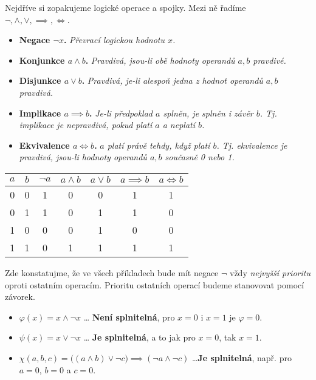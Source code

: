 Nejdříve si zopakujeme logické operace a spojky. Mezi ně řadíme $\neg, \land, \lor, \implies, \iff$.
\begin{itemize}
    \item \textbf{Negace $\neg x$.} \emph{Převrací logickou hodnotu $x$.}
    \item \textbf{Konjunkce $a\land b$.} \emph{Pravdivá, jsou-li obě hodnoty operandů $a,b$ pravdivé.}
    \item \textbf{Disjunkce $a\lor b$.} \emph{Pravdivá, je-li alespoň jedna z hodnot operandů $a,b$ pravdivá.}
    \item \textbf{Implikace $a\implies b$.} \emph{Je-li předpoklad $a$ splněn, je splněn i závěr $b$. Tj. implikace je nepravdivá, pokud platí $a$ a neplatí $b$.}
    \item \textbf{Ekvivalence $a\iff b$.} \emph{$a$ platí právě tehdy, když platí $b$. Tj. ekvivalence je pravdivá, jsou-li hodnoty operandů $a,b$ současně 0 nebo 1.}
\end{itemize}
\begin{table}[h]\label{table:logicke_operace}
    \centering
    \begin{tabular}{|c|c|c|c|c|c|c|}
    \hline
    $a$ & $b$ & $\neg a$ & $a\land b$ & $a\lor b$ & $a\implies b$ & $a\iff b$ \\ \hline
    0   & 0   & 1        & 0          & 0         & 1             & 1         \\ \hline
    0   & 1   & 1        & 0          & 1         & 1             & 0         \\ \hline
    1   & 0   & 0        & 0          & 1         & 0             & 0         \\ \hline
    1   & 1   & 0        & 1          & 1         & 1             & 1         \\ \hline
    \end{tabular}
\end{table}
Zde konstatujme, že ve všech příkladech bude mít negace $\neg$ vždy \emph{nejvyšší prioritu} oproti ostatním operacím. Prioritu ostatních operací budeme stanovovat pomocí závorek. 
\begin{example}\label{ex:sat_formule}
    \begin{itemize}
        \item $\varphi(x)=x\land\neg x$ \dots \textbf{ Není splnitelná}, pro $x=0$ i $x=1$ je $\varphi=0$.
        \item $\psi(x)=x\lor\neg x$ \dots \textbf{ Je splnitelná}, a to jak pro $x=0$, tak $x=1$.
        \item $\chi(a,b,c)=\big((a\land b)\lor \neg c\big)\implies (\neg a\land\neg c)$ \dots \textbf{Je splnitelná}, např. pro $a=0$, $b=0$ a $c=0$.
    \end{itemize}
\end{example}
